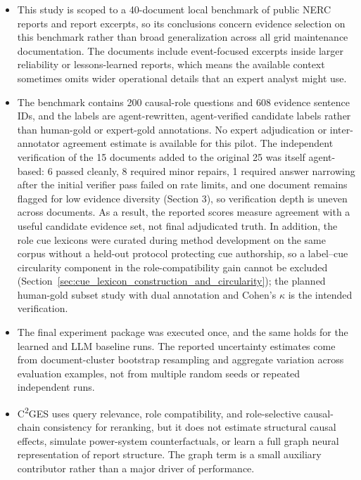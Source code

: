 \documentclass{ieeeaccess}
\begin{document}
\begin{itemize}
  \item This study is scoped to a 40-document local benchmark of public NERC reports and report excerpts, so its conclusions concern evidence selection on this benchmark rather than broad generalization across all grid maintenance documentation. The documents include event-focused excerpts inside larger reliability or lessons-learned reports, which means the available context sometimes omits wider operational details that an expert analyst might use.
  \item The benchmark contains 200 causal-role questions and 608 evidence sentence IDs, and the labels are agent-rewritten, agent-verified candidate labels rather than human-gold or expert-gold annotations. No expert adjudication or inter-annotator agreement estimate is available for this pilot. The independent verification of the 15 documents added to the original 25 was itself agent-based: 6 passed cleanly, 8 required minor repairs, 1 required answer narrowing after the initial verifier pass failed on rate limits, and one document remains flagged for low evidence diversity (Section 3), so verification depth is uneven across documents. As a result, the reported scores measure agreement with a useful candidate evidence set, not final adjudicated truth. In addition, the role cue lexicons were curated during method development on the same corpus without a held-out protocol protecting cue authorship, so a label--cue circularity component in the role-compatibility gain cannot be excluded (Section~\ref{sec:cue_lexicon_construction_and_circularity}); the planned human-gold subset study with dual annotation and Cohen's \(\kappa\) is the intended verification.
  \item The final experiment package was executed once, and the same holds for the learned and LLM baseline runs. The reported uncertainty estimates come from document-cluster bootstrap resampling and aggregate variation across evaluation examples, not from multiple random seeds or repeated independent runs.
  \item C\textsuperscript{2}GES uses query relevance, role compatibility, and role-selective causal-chain consistency for reranking, but it does not estimate structural causal effects, simulate power-system counterfactuals, or learn a full graph neural representation of report structure. The graph term is a small auxiliary contributor rather than a major driver of performance.

\end{itemize}
\end{document}
